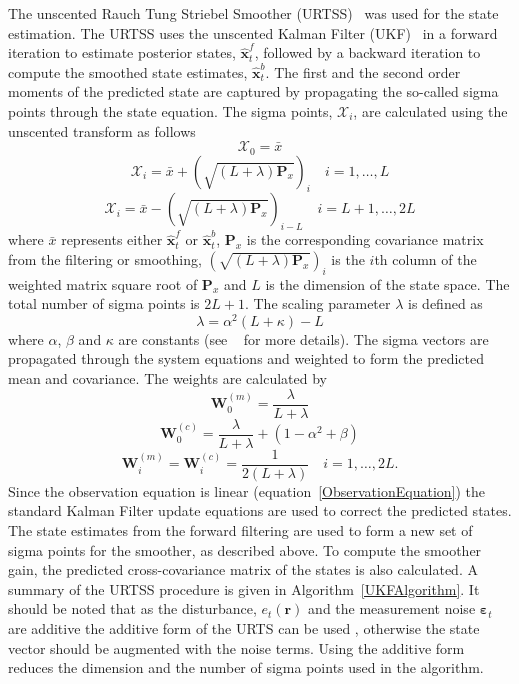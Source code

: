 \documentclass[12pt]{iopart}
\begin{document}
The unscented Rauch Tung Striebel Smoother (URTSS)~\cite{Sarkka2010} was used for the state estimation. The URTSS uses the unscented Kalman Filter (UKF)~\cite{Julier1997, Merwe2003} in a forward iteration to estimate posterior states, $\hat{\mathbf x}_t^{f}$, followed by a backward iteration to compute the smoothed state estimates, $\hat{\mathbf x}_t^{b}$. The first and the second order moments of the predicted state are captured by propagating the so-called sigma points through the state equation. The sigma points, $\mathcal X_i$, are calculated using the unscented transform as follows
\begin{equation}\label{eq:sigmapoints1}
	\mathcal X_{0}=\bar x 
\end{equation}
\begin{equation}
	\mathcal X_{i}=\bar x+(\sqrt{( L + \lambda)\mathbf P_x})_i \quad i=1, \dots, L 
\end{equation}
\begin{equation}\label{eq:sigmapoints2}
	\mathcal X_{i}=\bar x-(\sqrt{( L + \lambda)\mathbf P_x})_{i- L} \quad i= L+1, \dots, 2 L 
\end{equation}
where $\bar x$ represents either $\hat{\mathbf x}_t^{f}$ or $\hat{\mathbf x}_t^{b}$, $\mathbf{P}_x$ is the corresponding covariance matrix from the filtering or smoothing, $(\sqrt{( L + \lambda)\mathbf P_x})_i$ is the $i$th column of the weighted matrix square root of $\mathbf P_x$ and $L$ is the dimension of the state space. The total number of sigma points is $2L+1$. The scaling parameter $\lambda$ is defined as 
\begin{equation}\label{eq:sigmapoints3}
	\lambda=\alpha^2( L+\kappa)- L 
\end{equation}
where $\alpha$, $\beta$ and $\kappa$ are constants (see ~\cite{Haykin2001} for more details). The sigma vectors are propagated through the system equations and weighted to form the predicted mean and covariance. The weights are calculated by 
\begin{equation}
	\mathbf W_0^{(m)}=\frac{\lambda}{ L+\lambda} 
\end{equation}
\begin{equation}
	\mathbf W_0^{(c)}=\frac{\lambda}{ L+\lambda}+(1-\alpha^2+\beta) 
\end{equation}
\begin{equation}
	\mathbf W_i^{(m)}=\mathbf W_i^{(c)}=\frac{1}{2( L+\lambda)} \quad i=1, \dots, 2L. 
\end{equation}
Since the observation equation is linear (equation~\ref{ObservationEquation}) the standard Kalman Filter update equations are  used to correct the predicted states. The state estimates from the forward filtering are used to form a new set of sigma points for the smoother, as described above. To compute the smoother gain, the predicted cross-covariance matrix of the states is also calculated. A summary of the URTSS procedure is given in Algorithm~\ref{UKFAlgorithm}. It should be noted that as the disturbance, $e_t\left(\mathbf{r}\right)$ and the measurement noise $ \boldsymbol{\varepsilon}_t$ are additive the additive form of the URTS can be used , otherwise the state vector should be augmented with the noise terms. Using the additive form reduces the dimension and the number of sigma points used in the algorithm.
\end{document}
